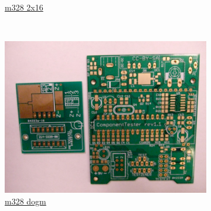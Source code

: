 \documentclass[pdftex,12pt,a4paper,english]{article}
\begin{document}
\begin{figure}[H]
\begin{subfigure}[b]{.3\textwidth}
	  {\href{run:./trunk/mega328/}{m328 2x16}}
  \end{subfigure}
~
  \begin{subfigure}[b]{.3\textwidth}
    \centering
    \includegraphics[width=1.\textwidth]{../PNG/m328_moritz.JPG}
	  \\ \vspace{-0.5em}
	  {\href{run:./trunk/mega328_strip_grid_dogm/}{m328 dogm}}
  \end{subfigure}
\end{figure}
\vspace{-1em}
\end{document}
